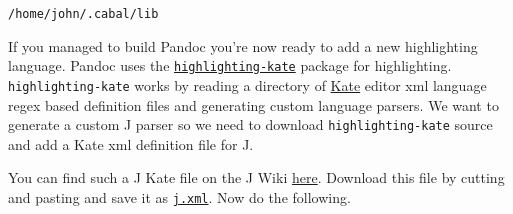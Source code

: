 \begin{verbatim}
/home/john/.cabal/lib
\end{verbatim}

If you managed to build Pandoc you're now ready to add a new
highlighting language. Pandoc uses the
\href{http://hackage.haskell.org/package/highlighting-kate-0.5.3.2}{\texttt{highlighting-kate}}
package for highlighting. \texttt{highlighting-kate} works by
reading a directory of \href{http://kate-editor.org/}{Kate} editor xml
language regex based definition files and generating custom language
parsers. We want to generate a custom J parser so we need to download
\texttt{highlighting-kate} source and add a Kate xml definition file for
J.

You can find such a J Kate file on the J Wiki
\href{http://www.jsoftware.com/jwiki/Guides/Syntax\%20Coloring?action=AttachFile\&do=view\&target=j.xml.txt}{here}.
Download this file by cutting and pasting and save it as \href{https://www.box.com/s/wvms2a1ws3il81kyb1qo}{\texttt{j.xml}}.
Now do the following.


